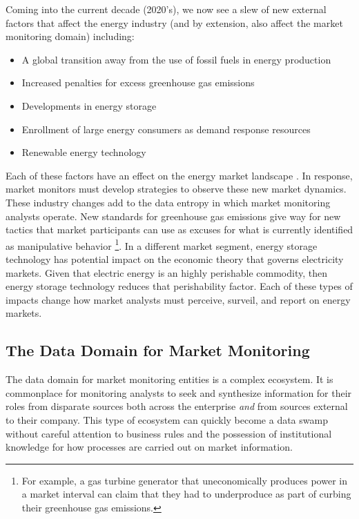 Coming into the current decade (2020's), we now see a slew of new external factors that affect the energy industry (and by extension, also affect the market monitoring domain) including:

\begin{itemize}
    \item{A global transition away from the use of fossil fuels in energy production}
    \item{Increased penalties for excess greenhouse gas emissions}
    \item{Developments in energy storage}
    \item{Enrollment of large energy consumers as demand response resources}
    \item{Renewable energy technology}
\end{itemize} 

Each of these factors have an effect on the energy market landscape \cite{bichler}. In response, market monitors must develop strategies to observe these new market dynamics. These industry changes add to the data entropy in which market monitoring analysts operate. New standards for greenhouse gas emissions give way for new tactics that market participants can use as excuses for what is currently identified as manipulative behavior \footnote{For example, a gas turbine generator that uneconomically produces power in a market interval can claim that they had to underproduce as part of curbing their greenhouse gas emissions.}. In a different market segment, energy storage technology has potential impact on the economic theory that governs electricity markets. Given that electric energy is an highly perishable commodity, then energy storage technology reduces that perishability factor. Each of these types of impacts change how market analysts must perceive, surveil, and report on energy markets.

\subsection{The Data Domain for Market Monitoring}

The data domain for market monitoring entities is a complex ecosystem. It is commonplace for monitoring analysts to seek and synthesize information for their roles from disparate sources both across the enterprise \textit{and} from sources external to their company. This type of ecosystem can quickly become a data swamp without careful attention to business rules and the possession of institutional knowledge for how processes are carried out on market information.

